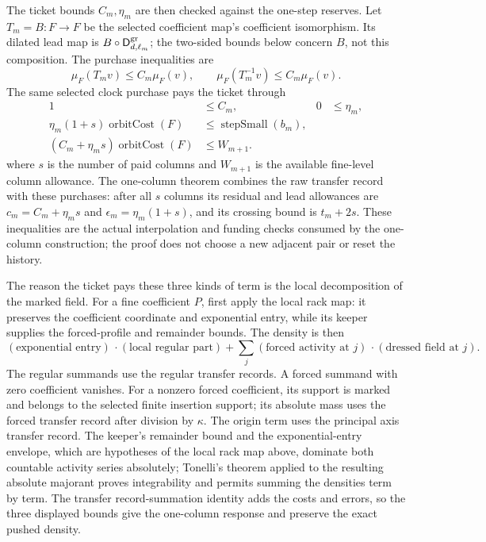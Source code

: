 The ticket bounds $C_m,\eta_m$ are then checked against the one-step reserves. Let $T_m=B:F\to F$ be the selected coefficient map's coefficient
isomorphism. Its dilated lead map is $B\circ\mathsf D^{\rm gr}_{d,\ell_m}$;
the two-sided bounds below concern $B$, not this composition. The purchase inequalities are
\[
 \mu_F(T_m v)\leq C_m\mu_F(v),\qquad
 \mu_F(T_m^{-1}v)\leq C_m\mu_F(v).
\]
The same selected clock purchase pays the ticket through
\[
 \begin{aligned}
 1&\leq C_m, & 0&\leq\eta_m,\\
 \eta_m(1+s)\operatorname{orbitCost}(F)&\leq\operatorname{stepSmall}(b_m),\\
 (C_m+\eta_m s)\operatorname{orbitCost}(F)&\leq W_{m+1}.
 \end{aligned}
\]
where $s$ is the number of paid columns and $W_{m+1}$ is the available fine-level column allowance. The one-column theorem combines the raw transfer record with these purchases: after all $s$ columns its residual and lead allowances are $c_m=C_m+\eta_m s$ and $\epsilon_m=\eta_m(1+s)$, and its crossing bound is $t_m+2s$. These inequalities are the actual interpolation and funding checks consumed by the one-column construction; the proof does not choose a new adjacent pair or reset the history.

The reason the ticket pays these three kinds of term is the local decomposition of the marked field. For a fine coefficient $P$, first apply the local rack map: it preserves the coefficient coordinate and exponential entry, while its keeper supplies the forced-profile and remainder bounds. The density is then
\[
 (\text{exponential entry})\,\cdot(\text{local regular part})
   +\sum_{j}(\text{forced activity at }j)\,\cdot(\text{dressed field at }j).
\]
The regular summands use the regular transfer records. A forced summand with zero coefficient vanishes. For a nonzero forced coefficient, its support is marked and belongs to the selected finite insertion support; its absolute mass uses the forced transfer record after division by $\kappa$. The origin term uses the principal axis transfer record. The keeper's remainder bound and the exponential-entry envelope, which are hypotheses of the local rack map above, dominate both countable activity series absolutely; Tonelli's theorem applied to the resulting absolute majorant proves integrability and permits summing the densities term by term. The transfer record-summation identity adds the costs and errors, so the three displayed bounds give the one-column response and preserve the exact pushed density.

